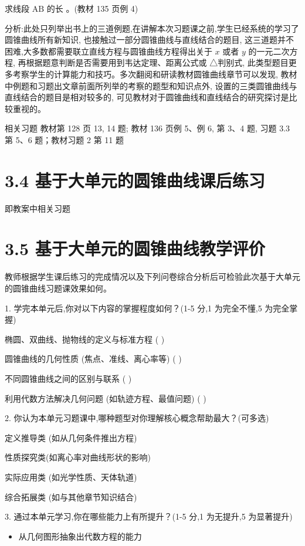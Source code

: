 \documentclass[10pt]{article}
\begin{document}
求线段 \(\mathrm{{AB}}\) 的长 \cite{2019_人民教育出版社_普通高中课程标准实验教科书}。(教材 135 页例 4)

分析:此处只列举出书上的三道例题,在讲解本次习题课之前,学生已经系统的学习了圆锥曲线所有新知识, 也接触过一部分圆锥曲线与直线结合的题目, 这三道题并不困难,大多数都需要联立直线方程与圆锥曲线方程得出关于 \(x\) 或者 \(y\) 的一元二次方程, 再根据题意判断是否需要用到韦达定理、距离公式或 △判别式, 此类型题目更多考察学生的计算能力和技巧。多次翻阅和研读教材圆锥曲线章节可以发现, 教材中例题和习题出文章前面所列举的考察的题型和知识点外, 设置的三类圆锥曲线与直线结合的题目是相对较多的, 可见教材对于圆锥曲线和直线结合的研究探讨是比较重视的。

相关习题 教材第 128 页 13, 14 题; 教材 136 页例 5、例 6, 第 3、4 题, 习题 3.3 第 5、6 题；教材习题 2 第 11 题

\section*{3.4 基于大单元的圆锥曲线课后练习}

即教案中相关习题

\section*{3.5 基于大单元的圆锥曲线教学评价}

教师根据学生课后练习的完成情况以及下列问卷综合分析后可检验此次基于大单元的圆锥曲线习题课效果如何。

1. 学完本单元后,你对以下内容的掌握程度如何？(1-5 分,1 为完全不懂,5 为完全掌握)

椭圆、双曲线、抛物线的定义与标准方程 (   )

圆锥曲线的几何性质 (焦点、准线、离心率等) (   )

不同圆锥曲线之间的区别与联系 (   )

利用代数方法解决几何问题 (如轨迹方程、最值问题) (   )

2. 你认为本单元习题课中,哪种题型对你理解核心概念帮助最大？(可多选)

定义推导类 (如从几何条件推出方程)

性质探究类(如离心率对曲线形状的影响)

实际应用类 (如光学性质、天体轨道)

综合拓展类 (如与其他章节知识结合)

3. 通过本单元学习,你在哪些能力上有所提升？(1-5 分,1 为无提升,5 为显著提升)

\begin{itemize}
\item 从几何图形抽象出代数方程的能力
\end{itemize}
\end{document}
